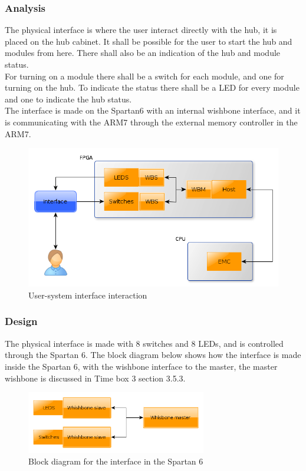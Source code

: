 \subsubsection{Analysis}
The physical interface is where the user interact directly with the hub, it is placed on the hub cabinet. It shall be possible for the user to start the hub and modules from here. There shall also be an indication of the hub and module status.\\
For turning on a module there shall be a switch for each module, and one for turning on the hub. To indicate the status there shall be a LED for every module and one to indicate the hub status.\\
The interface is made on the Spartan6 with an internal wishbone interface, and it is communicating with the ARM7 through the external memory controller in the ARM7.
\begin{figure}[H]
	\begin{centering}
		\includegraphics[width=1.0\textwidth]{content/appendix/eudp/images/analysis_phy_interface.png}
		\caption{User-system interface interaction}
	\end{centering}
\end{figure}
\subsubsection{Design}
The physical interface is made with 8 switches and 8 LEDs, and is controlled through the Spartan 6. The block diagram below shows how the interface is made inside the Spartan 6, with the wishbone interface to the master, the master wishbone is discussed in Time box 3 section 3.5.3.
\begin{figure}[H]
	\begin{centering}
			\includegraphics[width=0.7\textwidth]{content/appendix/eudp/images/Design_HWmodule.png}
			\caption{Block diagram for the interface in the Spartan 6}
	\end{centering}
\end{figure}
